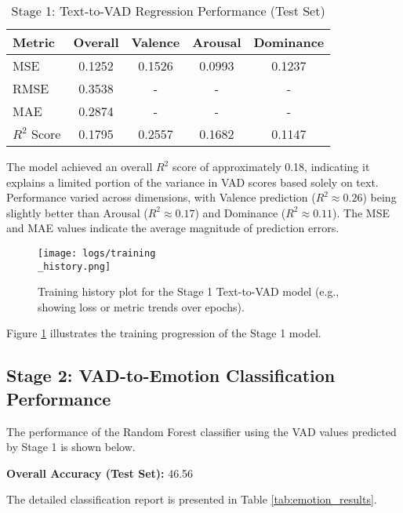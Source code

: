 \documentclass[conference]{IEEEtran}
\begin{document}
\begin{table}[htbp]
    \centering
    \caption{Stage 1: Text-to-VAD Regression Performance (Test Set)}
    \label{tab:vad_results}
    \begin{tabular}{@{}lcccc@{}}
        \toprule
        Metric   & Overall & Valence & Arousal & Dominance \\
        \midrule
        MSE      & 0.1252  & 0.1526  & 0.0993  & 0.1237    \\
        RMSE     & 0.3538  & -       & -       & -         \\
        MAE      & 0.2874  & -       & -       & -         \\
        $R^2$ Score & 0.1795  & 0.2557  & 0.1682  & 0.1147    \\
        \bottomrule
    \end{tabular}
\end{table}

The model achieved an overall $R^2$ score of approximately 0.18, indicating it explains a limited portion of the variance in VAD scores based solely on text. Performance varied across dimensions, with Valence prediction ($R^2 \approx 0.26$) being slightly better than Arousal ($R^2 \approx 0.17$) and Dominance ($R^2 \approx 0.11$). The MSE and MAE values indicate the average magnitude of prediction errors.

\begin{figure}[htbp]
    \centering
    \texttt{[image: logs/training\\\_history.png]}
    \caption{Training history plot for the Stage 1 Text-to-VAD model (e.g., showing loss or metric trends over epochs).}
    \label{fig:training_history}
\end{figure}

Figure \ref{fig:training_history} illustrates the training progression of the Stage 1 model.

\subsection{Stage 2: VAD-to-Emotion Classification Performance}
The performance of the Random Forest classifier using the VAD values predicted by Stage 1 is shown below.

\textbf{Overall Accuracy (Test Set):} 46.56%

The detailed classification report is presented in Table \ref{tab:emotion_results}.
\end{document}
